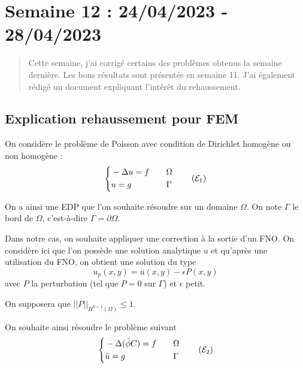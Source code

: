 \section{Semaine 12 : 24/04/2023 - 28/04/2023}
\graphicspath{{semaines/semaine_12/images/}}

\begin{abstract}
	Cette semaine, j'ai corrigé certains des problèmes obtenus la semaine dernière. Les bons résultats sont présentés en semaine 11. J'ai également rédigé un document expliquant l'intérêt du rehaussement.
\end{abstract}

\setlength\parindent{0pt}

\subsection{Explication rehaussement pour FEM \faBookmarkO}

On considère le problème de Poisson avec condition de Dirichlet homogène ou non homogène :
\begin{equation}
	\label{pb1}
	\left\{\begin{aligned}
		&-\Delta u=f \quad &&\Omega \\
		&u=g \quad &&\Gamma
	\end{aligned}\right. \tag{$\mathcal{E}_1$}
\end{equation}

On a ainsi une EDP que l'on souhaite résoudre sur un domaine $\Omega$. On note $\Gamma$ le bord de $\Omega$, c'est-à-dire $\Gamma=\partial\Omega$. 

Dans notre cas, on souhaite appliquer une correction à la sortie d'un FNO.
On considère ici que l'on possède une solution analytique $u$ et qu'après une utilisation du FNO, on obtient une solution du type
\begin{equation}
	\label{phi_tild}
	u_p(x,y) = u(x,y)-\epsilon P(x,y)
\end{equation}
avec $P$ la perturbation (tel que $P=0$ sur $\Gamma$) et $\epsilon$ petit.

On supposera que $||P||_{H^{k+1}(\Omega)}\le 1$.

On souhaite ainsi résoudre le problème suivant
\begin{equation}
	\label{pb2}
	\left\{\begin{aligned}
		&-\Delta (\tilde{\phi}C)=f \quad &&\Omega \\
		&\tilde{u}=g \quad &&\Gamma
	\end{aligned}\right. \tag{$\mathcal{E}_2$}
\end{equation}

